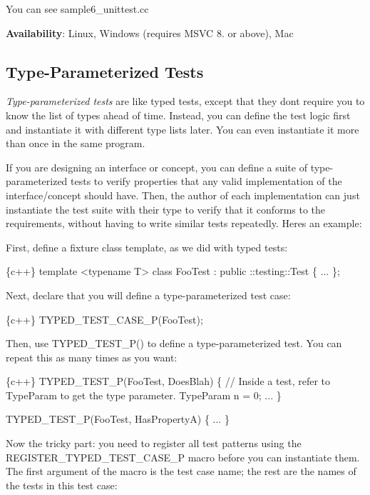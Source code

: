 You can see sample6\+\_\+unittest.\+cc

{\bfseries Availability}\+: Linux, Windows (requires M\+S\+VC 8. or above), Mac

\subsection*{Type-\/\+Parameterized Tests}

{\itshape Type-\/parameterized tests} are like typed tests, except that they don\textquotesingle{}t require you to know the list of types ahead of time. Instead, you can define the test logic first and instantiate it with different type lists later. You can even instantiate it more than once in the same program.

If you are designing an interface or concept, you can define a suite of type-\/parameterized tests to verify properties that any valid implementation of the interface/concept should have. Then, the author of each implementation can just instantiate the test suite with their type to verify that it conforms to the requirements, without having to write similar tests repeatedly. Here\textquotesingle{}s an example\+:

First, define a fixture class template, as we did with typed tests\+:


\begin{DoxyCode}
\{c++\}
template <typename T>
class FooTest : public ::testing::Test \{
  ...
\};
\end{DoxyCode}


Next, declare that you will define a type-\/parameterized test case\+:


\begin{DoxyCode}
\{c++\}
TYPED\_TEST\_CASE\_P(FooTest);
\end{DoxyCode}


Then, use {\ttfamily T\+Y\+P\+E\+D\+\_\+\+T\+E\+S\+T\+\_\+\+P()} to define a type-\/parameterized test. You can repeat this as many times as you want\+:


\begin{DoxyCode}
\{c++\}
TYPED\_TEST\_P(FooTest, DoesBlah) \{
  // Inside a test, refer to TypeParam to get the type parameter.
  TypeParam n = 0;
  ...
\}

TYPED\_TEST\_P(FooTest, HasPropertyA) \{ ... \}
\end{DoxyCode}


Now the tricky part\+: you need to register all test patterns using the {\ttfamily R\+E\+G\+I\+S\+T\+E\+R\+\_\+\+T\+Y\+P\+E\+D\+\_\+\+T\+E\+S\+T\+\_\+\+C\+A\+S\+E\+\_\+P} macro before you can instantiate them. The first argument of the macro is the test case name; the rest are the names of the tests in this test case\+:


